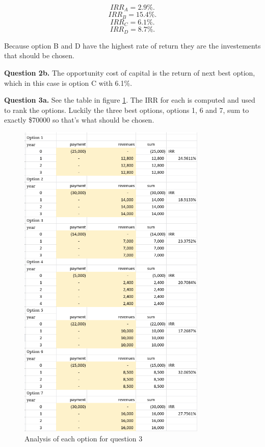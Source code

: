\documentclass[letterpaper, reqno,11pt]{article}
\begin{document}
 \[
IRR_A = 2.9\%
.\]
 \[
IRR_B = 15.4\%
.\]
 \[
IRR_C = 6.1\%
.\]
 \[
IRR_D = 8.7\%
.\]

Because option B and D have the highest rate of return they are the investements that should be chosen. 

{\noindent\bf Question 2b.} The opportunity cost of capital is the return of next best option, which in this case is option C with 6.1\%. 

{\noindent\bf Question 3a.} See the table in figure \ref{fig:q3}. The IRR for each is computed and used to rank the options. Luckily the three best options, options 1, 6 and 7, sum to exactly \$70000 so that's what should be chosen. 
\begin{figure}[htpb]
    \centering
    \includegraphics[width=0.8\textwidth]{q3}
    \caption{Analysis of each option for question 3}
    \label{fig:q3}
\end{figure}
\end{document}
